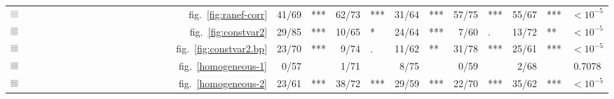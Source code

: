 \documentclass[12pt]{article} %
\begin{document}
\begin{table}[ht]
\begin{tabular}{Mrrlrlrlrlrlc}
 \includegraphics[width=0.05\textwidth]{examcorr-icon}&   fig.~\ref{fig:ranef-corr} & 41/69&\hspace{-0.1in}*** & 62/73&\hspace{-0.1in}*** & 31/64&\hspace{-0.1in}*** & 57/75&\hspace{-0.1in}*** & 55/67&\hspace{-0.1in}*** & $<10^{-5}$\\ 
\includegraphics[width=0.05\textwidth]{dialyzerheterogeneous-icon}& fig.~\ref{fig:constvar2} & 29/85&\hspace{-0.1in}***  & 10/65&\hspace{-0.1in}* & 24/64&\hspace{-0.1in}*** & 7/60&\hspace{-0.1in}. & 13/72&\hspace{-0.1in}** & $<10^{-5}$\\ 
\includegraphics[width=0.05\textwidth]{dialyzerheterogeneous-bp} &  fig.~\ref{fig:constvar2.bp} & 23/70 & \hspace{-0.1in}*** & 9/74 & \hspace{-0.1in}. & 11/62 & \hspace{-0.1in}** & 31/78 & \hspace{-0.1in}*** & 25/61 & \hspace{-0.1in}*** & $<10^{-5}$\\ 
%
 \includegraphics[width=0.05\textwidth]{homogeneous-dots-icon} & fig.~\ref{homogeneous-1}& 0/57 & \hspace{-0.1in}  & 1/71 & \hspace{-0.1in}  & 8/75 & \hspace{-0.1in}  & 0/59 & \hspace{-0.1in}  & 2/68 & \hspace{-0.1in}  & 0.7078 \\ 
\includegraphics[width=0.05\textwidth]{homogeneous-bp-icon} &  fig.~\ref{homogeneous-2}& 23/61 & \hspace{-0.1in}*** & 38/72 & \hspace{-0.1in}*** & 29/59 & \hspace{-0.1in}*** & 22/70 & \hspace{-0.1in}*** & 35/62 & \hspace{-0.1in}*** & $<10^{-5}$\\ 

\end{tabular}
\end{table}
\end{document}

